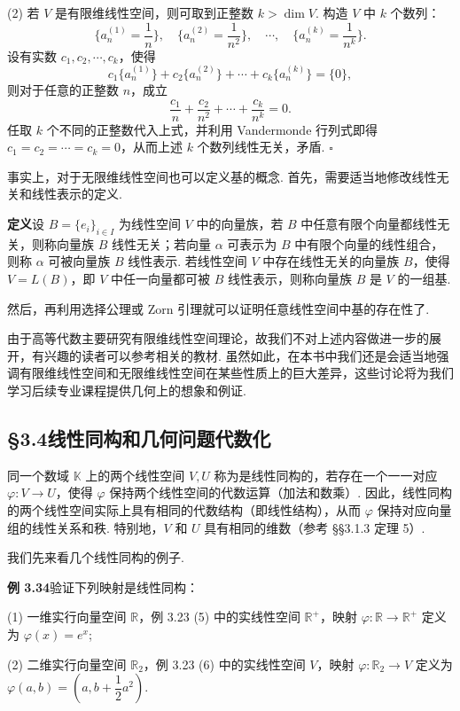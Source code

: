 \documentclass[UTF8,12pt,a4paper,fontset=fandol]{ctexart}
\begin{document}
(2) 若 $V$ 是有限维线性空间，则可取到正整数 $k>\dim V$. 构造 $V$ 中 $k$ 个数列：
\[
\{a_n^{(1)}=\frac{1}{n}\},\quad \{a_n^{(2)}=\frac{1}{n^2}\},\quad \cdots,\quad \{a_n^{(k)}=\frac{1}{n^k}\}.
\]
设有实数 $c_1,c_2,\cdots,c_k$，使得
\[
c_1\{a_n^{(1)}\}+c_2\{a_n^{(2)}\}+\cdots+c_k\{a_n^{(k)}\}=\{0\},
\]
则对于任意的正整数 $n$，成立
\[
\frac{c_1}{n}+\frac{c_2}{n^2}+\cdots+\frac{c_k}{n^k}=0.
\]
任取 $k$ 个不同的正整数代入上式，并利用 Vandermonde 行列式即得 $c_1=c_2=\cdots=c_k=0$，从而上述 $k$ 个数列线性无关，矛盾. $\square$

事实上，对于无限维线性空间也可以定义基的概念. 首先，需要适当地修改线性无关和线性表示的定义.

\noindent\textbf{定义}\quad 设 $B=\{e_i\}_{i\in I}$ 为线性空间 $V$ 中的向量族，若 $B$ 中任意有限个向量都线性无关，则称向量族 $B$ 线性无关；若向量 $\alpha$ 可表示为 $B$ 中有限个向量的线性组合，则称 $\alpha$ 可被向量族 $B$ 线性表示. 若线性空间 $V$ 中存在线性无关的向量族 $B$，使得 $V=L(B)$，即 $V$ 中任一向量都可被 $B$ 线性表示，则称向量族 $B$ 是 $V$ 的一组基.

然后，再利用选择公理或 Zorn 引理就可以证明任意线性空间中基的存在性了.

由于高等代数主要研究有限维线性空间理论，故我们不对上述内容做进一步的展开，有兴趣的读者可以参考相关的教材. 虽然如此，在本书中我们还是会适当地强调有限维线性空间和无限维线性空间在某些性质上的巨大差异，这些讨论将为我们学习后续专业课程提供几何上的想象和例证.

\subsection*{§3.4\quad 线性同构和几何问题代数化}

同一个数域 $\mathbb{K}$ 上的两个线性空间 $V,U$ 称为是线性同构的，若存在一个一一对应 $\varphi:V\to U$，使得 $\varphi$ 保持两个线性空间的代数运算（加法和数乘）. 因此，线性同构的两个线性空间实际上具有相同的代数结构（即线性结构），从而 $\varphi$ 保持对应向量组的线性关系和秩. 特别地，$V$ 和 $U$ 具有相同的维数（参考 §§3.1.3 定理 5）.

我们先来看几个线性同构的例子.

\noindent\textbf{例 3.34}\quad 验证下列映射是线性同构：

(1) 一维实行向量空间 $\mathbb{R}$，例 3.23 (5) 中的实线性空间 $\mathbb{R}^+$，映射 $\varphi:\mathbb{R}\to\mathbb{R}^+$ 定义为 $\varphi(x)=e^x$;

(2) 二维实行向量空间 $\mathbb{R}_2$，例 3.23 (6) 中的实线性空间 $V$，映射 $\varphi:\mathbb{R}_2\to V$ 定义为 $\varphi(a,b)=(a,b+\dfrac{1}{2}a^2)$.
\end{document}
